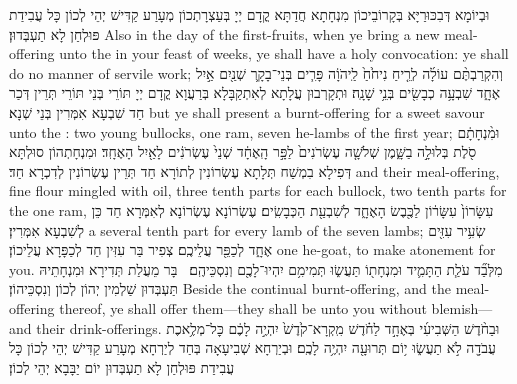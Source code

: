 {וּבְיוֹמָא דְּבִכּוּרַיָּא בְּקָרוֹבֵיכוֹן מִנְחָתָא חֲדַתָּא קֳדָם יְיָ בְּעַצְרָתְכוֹן מְעָרַע קַדִּישׁ יְהֵי לְכוֹן כָּל עֲבִידַת פּוּלְחַן לָא תַעְבְּדוּן׃}
{Also in the day of the first-fruits, when ye bring a new meal-offering unto the \lord\space in your feast of weeks, ye shall have a holy convocation: ye shall do no manner of servile work;}{}
{וְהִקְרַבְתֶּ֨ם עוֹלָ֜ה לְרֵ֤יחַ נִיחֹ֙חַ֙ לַֽיהֹוָ֔ה פָּרִ֧ים בְּנֵי־בָקָ֛ר שְׁנַ֖יִם אַ֣יִל אֶחָ֑ד שִׁבְעָ֥ה כְבָשִׂ֖ים בְּנֵ֥י שָׁנָֽה׃}
{וּתְקָרְבוּן עֲלָתָא לְאִתְקַבָּלָא בְּרַעֲוָא קֳדָם יְיָ תּוֹרֵי בְּנֵי תּוֹרֵי תְּרֵין דְּכַר חַד שִׁבְעָא אִמְּרִין בְּנֵי שְׁנָא׃}
{but ye shall present a burnt-offering for a sweet savour unto the \lord: two young bullocks, one ram, seven he-lambs of the first year;}{}
{וּמִ֨נְחָתָ֔ם סֹ֖לֶת בְּלוּלָ֣ה בַשָּׁ֑מֶן שְׁלֹשָׁ֤ה עֶשְׂרֹנִים֙ לַפָּ֣ר הָֽאֶחָ֔ד שְׁנֵי֙ עֶשְׂרֹנִ֔ים לָאַ֖יִל הָאֶחָֽד׃}
{וּמִנְחָתְהוֹן סוּלְתָּא דְּפִילָא בִמְשַׁח תְּלָתָא עֶשְׂרוֹנִין לְתוֹרָא חַד תְּרֵין עֶשְׂרוֹנִין לְדִכְרָא חַד׃}
{and their meal-offering, fine flour mingled with oil, three tenth parts for each bullock, two tenth parts for the one ram,}{}
{עִשָּׂרוֹן֙ עִשָּׂר֔וֹן לַכֶּ֖בֶשׂ הָאֶחָ֑ד לְשִׁבְעַ֖ת הַכְּבָשִֽׂים׃}
{עֶשְׂרוֹנָא עֶשְׂרוֹנָא לְאִמְּרָא חַד כֵּן לְשִׁבְעָא אִמְּרִין׃}
{a several tenth part for every lamb of the seven lambs;}{}
{שְׂעִ֥יר עִזִּ֖ים אֶחָ֑ד לְכַפֵּ֖ר עֲלֵיכֶֽם׃}
{צְפִיר בַּר עִזִּין חַד לְכַפָּרָא עֲלֵיכוֹן׃}
{one he-goat, to make atonement for you.}{}
{מִלְּבַ֞ד עֹלַ֧ת הַתָּמִ֛יד וּמִנְחָת֖וֹ תַּעֲשׂ֑וּ תְּמִימִ֥ם יִהְיוּ־לָכֶ֖ם וְנִסְכֵּיהֶֽם׃ \petucha 
{}}
{בָּר מֵעֲלַת תְּדִירָא וּמִנְחָתֵיהּ תַּעְבְּדוּן שַׁלְמִין יְהוֹן לְכוֹן וְנִסְכֵּיהוֹן׃}
{Beside the continual burnt-offering, and the meal-offering thereof, ye shall offer them—they shall be unto you without blemish—and their drink-offerings.}{}
\newperek
{}%
{וּבַחֹ֨דֶשׁ הַשְּׁבִיעִ֜י בְּאֶחָ֣ד לַחֹ֗דֶשׁ מִֽקְרָא־קֹ֙דֶשׁ֙ יִהְיֶ֣ה לָכֶ֔ם כׇּל־מְלֶ֥אכֶת עֲבֹדָ֖ה לֹ֣א תַעֲשׂ֑וּ י֥וֹם תְּרוּעָ֖ה יִהְיֶ֥ה לָכֶֽם׃}
{וּבְיַרְחָא שְׁבִיעָאָה בְּחַד לְיַרְחָא מְעָרַע קַדִּישׁ יְהֵי לְכוֹן כָּל עֲבִידַת פּוּלְחַן לָא תַעְבְּדוּן יוֹם יַבָּבָא יְהֵי לְכוֹן׃}
